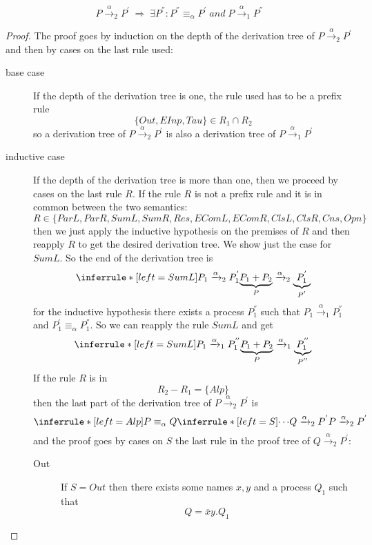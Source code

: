 \begin{theorem}
\[
  P\xrightarrow{\alpha}_{2}P^{'}\; \Rightarrow\; \exists P^{''}: P^{''}\equiv_{\alpha}P^{'}\; and\; P\xrightarrow{\alpha}_{1}P^{''}
\]
  \begin{proof}
    The proof goes by induction on the depth of the derivation tree of $P\xrightarrow{\alpha}_{2}P^{'}$ and then by cases on the last rule used:
    \begin{description}
      \item[base case]
	If the depth of the derivation tree is one, the rule used has to be a prefix rule 
	\[
	  \{Out, EInp, Tau\}\in R_{1}\cap R_{2}
	\]
	so a derivation tree of $P\xrightarrow{\alpha}_{2}P^{'}$ is also a derivation tree of $P\xrightarrow{\alpha}_{1}P^{'}$
      \item[inductive case]
	If the depth of the derivation tree is more than one, then we proceed by cases on the last rule $R$. If the rule $R$ is not a prefix rule and it is in common between the two semantics:
	\[
	  R\in \{ParL, ParR, SumL, SumR, Res, EComL, EComR, ClsL, ClsR, Cns, Opn\}
	\]
	then we just apply the inductive hypothesis on the premises of $R$ and then reapply $R$ to get the desired derivation tree. We show just the case for $SumL$. So the end of the derivation tree is 
	\[
	  \inferrule* [left=SumL]{
	    P_{1}\xrightarrow{\alpha}_{2}P_{1}^{'}
	  }{
	    \underbrace{P_{1}+P_{2}}_{P}\xrightarrow{\alpha}_{2}\underbrace{P_{1}^{'}}_{P^{'}}
	  }
	\]
	for the inductive hypothesis there exists a process $P_{1}^{''}$ such that $P_{1}\xrightarrow{\alpha}_{1}P_{1}^{''}$ and $P_{1}^{'}\equiv_{\alpha}P_{1}^{''}$. So we can reapply the rule $SumL$ and get
	\[
	  \inferrule* [left=SumL]{
	    P_{1}\xrightarrow{\alpha}_{1}P_{1}^{''}
	  }{
	    \underbrace{P_{1}+P_{2}}_{P}\xrightarrow{\alpha}_{1}\underbrace{P_{1}^{''}}_{P^{''}}
	  }
	\]
	If the rule $R$ is in 
	\[
	  R_{2}-R_{1}=\{Alp\}
	\]
	then the last part of the derivation tree of $P\xrightarrow{\alpha}_{2}P^{'}$ is
	\[
	  \inferrule* [left=Alp]{
	      P\equiv_{\alpha}Q
	    \\
	      \inferrule* [left=S]{
		\cdots
	      }{
		Q\xrightarrow{\alpha}_{2}P^{'}
	      }
	  }{
	    P\xrightarrow{\alpha}_{2}P^{'}
	  }
	\]
	and the proof goes by cases on $S$ the last rule in the proof tree of $Q\xrightarrow{\alpha}_{2}P^{'}$:
	\begin{description}
	  \item[Out]
	    If $S=Out$ then there exists some names $x,y$ and a process $Q_{1}$ such that 
	    \[
	      Q=\overline{x}y.Q_{1}
	    \]

\end{description}
\end{description}
\end{proof}
\end{theorem}
